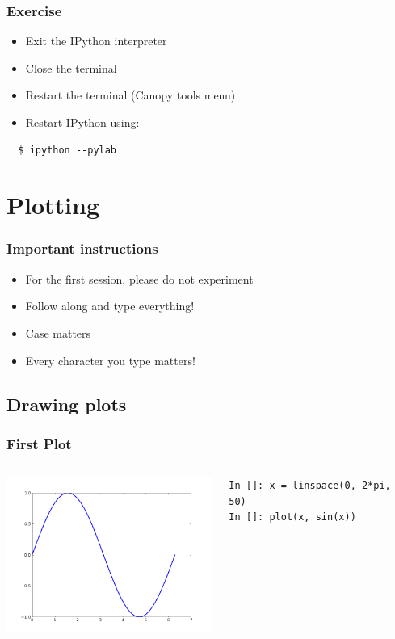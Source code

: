 \documentclass[14pt,compress]{beamer}
\newcounter{time}
\newcommand{\inctime}[1]{\addtocounter{time}{#1}{\tiny \thetime\ m}}
\begin{document}
\begin{frame}[fragile]
  \frametitle{Exercise}

  \begin{itemize}
  \item Exit the IPython interpreter
  \item Close the terminal
  \item Restart the terminal (Canopy tools menu)
  \item Restart IPython using:
  \end{itemize}
\begin{lstlisting}
  $ ipython --pylab
\end{lstlisting} %
  \inctime{10}
\end{frame}

\section{Plotting}

\begin{frame}
  \frametitle{Important instructions}
  \begin{itemize}
  \item For the first session, please do not experiment
  \item Follow along and type everything!
  \item Case matters
  \item Every character you type matters!
  \end{itemize}
\end{frame}

\subsection{Drawing plots}
\begin{frame}[fragile]
\frametitle{First Plot}
\begin{columns}
    \hspace*{-0.25in}
  \includegraphics[height=2in, interpolate=true]{data/firstplot}
    \begin{block}{}
    \begin{small}
\begin{lstlisting}
In []: x = linspace(0, 2*pi, 50)
In []: plot(x, sin(x))
\end{lstlisting}
    \end{small}
    \end{block}
\end{columns}
\end{frame}
\end{document}
